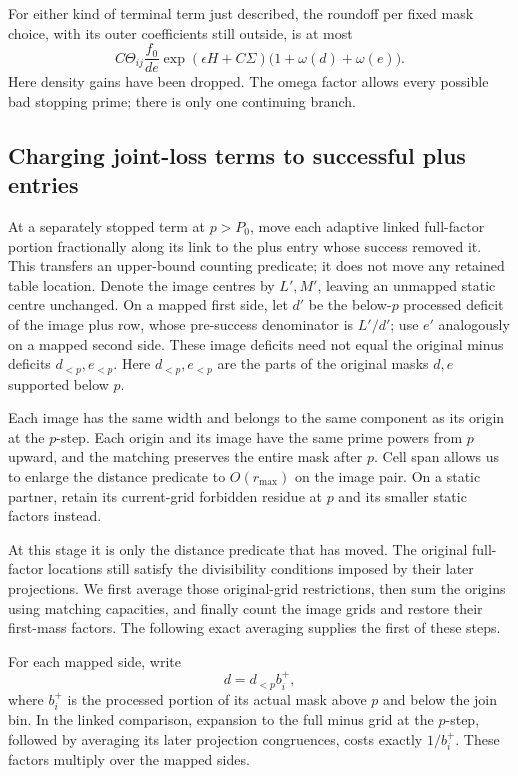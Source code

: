 For either kind of terminal term just described, the roundoff per fixed mask choice,
with its outer coefficients still outside, is at most
\begin{equation}\label{eq:no-link-roundoff}
 C\Theta_{ij}\frac{f_0}{de}
 \exp(\epsilon H+C\Sigma)
 \bigl(1+\omega(d)+\omega(e)\bigr).
\end{equation}
Here density gains have been dropped. The omega factor allows every
possible bad stopping prime; there is only one continuing branch.

\subsection{Charging joint-loss terms to successful plus entries}

At a separately stopped term at $p>P_0$, move each adaptive linked
full-factor portion fractionally along its link to the plus entry
whose success removed it. This transfers an upper-bound counting
predicate; it does not move any retained table location. Denote the
image centres by $L',M'$, leaving an unmapped static centre unchanged.
On a mapped first side, let $d'$ be the below-$p$ processed deficit of
the image plus row, whose pre-success denominator is $L'/d'$; use $e'$
analogously on a mapped second side. These image deficits need not
equal the original minus deficits $d_{<p},e_{<p}$.
Here $d_{<p},e_{<p}$ are the parts of the original masks $d,e$
supported below $p$.

Each image has the same width and belongs to the same component as its
origin at the $p$-step. Each origin and its image have the same prime powers from $p$
upward, and the matching preserves the entire mask after $p$. Cell
span allows us to enlarge the distance predicate to $O(r_{\max})$ on
the image pair. On a static partner, retain its current-grid forbidden
residue at $p$ and its smaller static factors instead.

At this stage it is only the distance predicate that has moved. The
original full-factor locations still satisfy the divisibility
conditions imposed by their later projections. We first average those
original-grid restrictions, then sum the origins using matching
capacities, and finally count the image grids and restore their
first-mass factors. The following exact averaging supplies the first
of these steps.

\begin{lemma}\label{join:later-omissions}
For each mapped side, write
\[
 d=d_{<p}b_i^+,
\]
where $b_i^+$ is the processed portion of its actual mask above $p$
and below the join bin. In the linked comparison, expansion to the
full minus grid at the $p$-step, followed by averaging its later
projection congruences, costs exactly $1/b_i^+$. These factors multiply
over the mapped sides.
\end{lemma}

